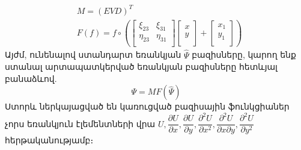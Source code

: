 \documentclass[fleqn, bachelor,subf,12pt,notitlepage]{article}
\begin{document}
\begin{equation}
\begin{aligned}
			&M = \left(EVD\right)^{T}\\
			&F(f) = f \circ \left(\begin{bmatrix}
							\xi_{23} & \xi_{31} \\
							\eta_{23} & \eta_{31} \\
				\end{bmatrix}\begin{bmatrix}
							x \\
							y \\
							\end{bmatrix} + \begin{bmatrix}
							x_{1} \\
							y_{1} \\
							\end{bmatrix}\right)
\end{aligned}
\end{equation}
Այժմ, ունենալով ստանդարտ եռանկյան $\hat{\Psi}$ բազիսները, կարող ենք ստանալ արտապատկերված եռանկյան բազիսները հետևյալ բանաձևով.
\begin{equation}
\Psi = MF\left(\hat{\Psi}\right)
\end{equation} 
Ստորև ներկայացված են կառուցված բազիսային ֆունկցիաներ չորս եռանկյուն էլեմենտների վրա $U, \dfrac{\partial U}{\partial x}, \dfrac{\partial U}{\partial y}, \dfrac{\partial^{2} U}{\partial x^{2}}, \dfrac{\partial^{2} U}{\partial x\partial y}, \dfrac{\partial^{2} U}{\partial y^{2}}$ հերթականությամբ։
\end{document}
